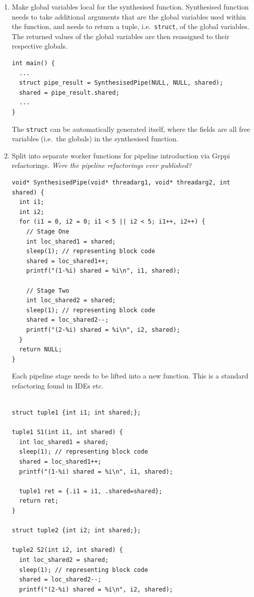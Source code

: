 \documentclass{llncs}
\begin{document}
\begin{enumerate}
\item Make global variables local for the synthesised function. Synthesised function needs to take additional arguments that are the global variables used within the function, and needs to return a tuple, i.e.\ \lstinline|struct|, of the global variables. The returned values of the global variables are then reassigned to their respective globals.
\begin{lstlisting}[frame=single]
int main() {
  ...
  struct pipe_result = SynthesisedPipe(NULL, NULL, shared);
  shared = pipe_result.shared;
  ...
}
\end{lstlisting}
The \lstinline|struct| can be automatically generated itself, where the fields are all free variables (i.e.\ the globals) in the synthesised function.

\item Split into separate worker functions for pipeline introduction via Grppi refactorings. \emph{Were the pipeline refactorings ever published?}
\begin{lstlisting}[frame=single]
void* SynthesisedPipe(void* threadarg1, void* threadarg2, int shared) {
  int i1;
  int i2;
  for (i1 = 0, i2 = 0; i1 < 5 || i2 < 5; i1++, i2++) {
    // Stage One
    int loc_shared1 = shared;
    sleep(1); // representing block code
    shared = loc_shared1++;
    printf("(1-%i) shared = %i\n", i1, shared);  
   
    // Stage Two
    int loc_shared2 = shared;
    sleep(1); // representing block code
    shared = loc_shared2--;
    printf("(2-%i) shared = %i\n", i2, shared);
  }
  return NULL;
}
\end{lstlisting}
Each pipeline stage needs to be lifted into a new function. This is a standard refactoring found in IDEs etc.\ 
\begin{lstlisting}[frame=single]

struct tuple1 {int i1; int shared;};

tuple1 S1(int i1, int shared) {
  int loc_shared1 = shared;
  sleep(1); // representing block code
  shared = loc_shared1++;
  printf("(1-%i) shared = %i\n", i1, shared);  
  
  tuple1 ret = {.i1 = i1, .shared=shared};
  return ret;
}

struct tuple2 {int i2; int shared;};

tuple2 S2(int i2, int shared) {
  int loc_shared2 = shared;
  sleep(1); // representing block code
  shared = loc_shared2--;
  printf("(2-%i) shared = %i\n", i2, shared);
  

\end{lstlisting}
\end{enumerate}
\end{document}
